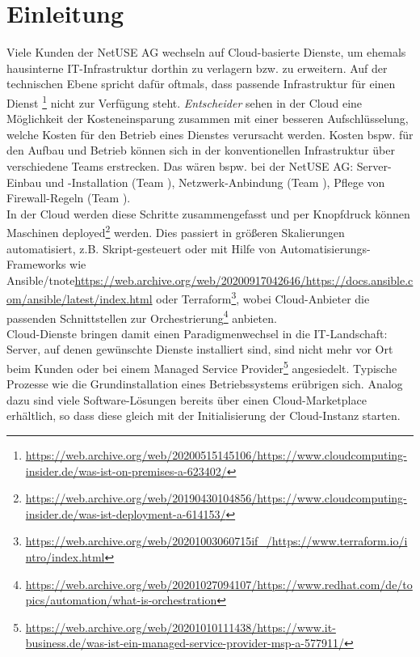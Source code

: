 \chapter{Einleitung}

Viele Kunden der NetUSE AG wechseln auf Cloud-basierte Dienste, um ehemals hausinterne IT-Infrastruktur dorthin zu verlagern bzw. zu erweitern. Auf der technischen Ebene spricht dafür oftmals, dass passende Infrastruktur für einen Dienst \footnote{\url{https://web.archive.org/web/20200515145106/https://www.cloudcomputing-insider.de/was-ist-on-premises-a-623402/}} nicht zur Verfügung steht. \textit{Entscheider} sehen in der Cloud eine Möglichkeit der Kosteneinsparung zusammen mit einer besseren Aufschlüsselung, welche Kosten für den Betrieb eines Dienstes verursacht werden. Kosten bspw. für den Aufbau und Betrieb können sich in der konventionellen Infrastruktur über verschiedene Teams erstrecken. Das wären bspw. bei der NetUSE AG: Server-Einbau und -Installation (Team \grqq{}), Netzwerk-Anbindung (Team \grqq{}), Pflege von Firewall-Regeln (Team \grqq{}).\\
In der Cloud werden diese Schritte zusammengefasst und per Knopfdruck können Maschinen deployed\footnote{\url{https://web.archive.org/web/20190430104856/https://www.cloudcomputing-insider.de/was-ist-deployment-a-614153/}} werden. Dies passiert in größeren Skalierungen automatisiert, z.B. Skript-gesteuert oder mit Hilfe von Automatisierungs-Frameworks wie Ansible\foo/tnote{\url{https://web.archive.org/web/20200917042646/https://docs.ansible.com/ansible/latest/index.html}} oder Terraform\footnote{\url{https://web.archive.org/web/20201003060715if\_/https://www.terraform.io/intro/index.html}}, wobei Cloud-Anbieter die passenden Schnittstellen zur Orchestrierung\footnote{\url{https://web.archive.org/web/20201027094107/https://www.redhat.com/de/topics/automation/what-is-orchestration}} anbieten.\\
Cloud-Dienste bringen damit einen Paradigmenwechsel in die IT-Landschaft: Server, auf denen gewünschte Dienste installiert sind, sind nicht mehr vor Ort beim Kunden oder bei einem Managed Service Provider\footnote{\url{https://web.archive.org/web/20201010111438/https://www.it-business.de/was-ist-ein-managed-service-provider-msp-a-577911/}} angesiedelt. Typische Prozesse wie die Grundinstallation eines Betriebssystems erübrigen sich. Analog dazu sind viele Software-Lösungen bereits über einen Cloud-Marketplace erhältlich, so dass diese gleich mit der Initialisierung der Cloud-Instanz starten.\\

